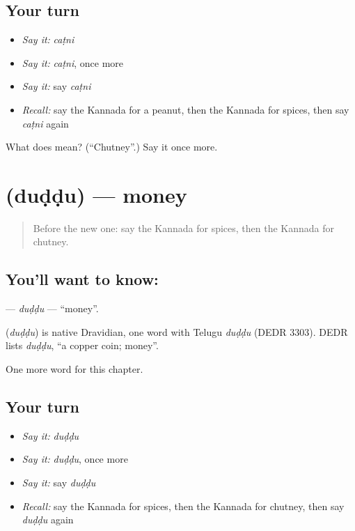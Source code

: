 \subsection*{Your turn}
\begin{itemize}
\raggedright
  \item \emph{Say it:} \emph{caṭni}
  \item \emph{Say it:} \emph{caṭni}, once more
  \item \emph{Say it:} say \emph{caṭni}
  \item \emph{Recall:} say the Kannada for a peanut, then the Kannada for spices, then say \emph{caṭni} again
\end{itemize}

\begin{tcolorbox}[breakable,colback=teal!4,colframe=teal!35!black,title={Before you move on}]
What does  mean? (\textquotedblleft{}Chutney\textquotedblright{}.) Say it once more.
\end{tcolorbox}
\section[\texorpdfstring{\kn{ದುಡ್ಡು} (duḍḍu)}{ದುಡ್ಡು (duḍḍu)}]{ (duḍḍu) — money}

\label{lesson:KA-C294-duddu}



\begin{quote}
Before the new one: say the Kannada for spices, then the Kannada for chutney.
\end{quote}

\subsection*{You'll want to know: }
\textbf{} — \emph{duḍḍu} — \textquotedblleft{}money\textquotedblright{}.

\begin{cousinweb}
\textbf{} (\emph{duḍḍu}) is native Dravidian, one word with Telugu \emph{duḍḍu} (DEDR 3303). DEDR lists \emph{duḍḍu}, \textquotedblleft{}a copper coin; money\textquotedblright{}.
\end{cousinweb}

\begin{grammarlens}[title={What you've built}]
One more word for this chapter.
\end{grammarlens}

\subsection*{Your turn}
\begin{itemize}
\raggedright
  \item \emph{Say it:} \emph{duḍḍu}
  \item \emph{Say it:} \emph{duḍḍu}, once more
  \item \emph{Say it:} say \emph{duḍḍu}
  \item \emph{Recall:} say the Kannada for spices, then the Kannada for chutney, then say \emph{duḍḍu} again
\end{itemize}

